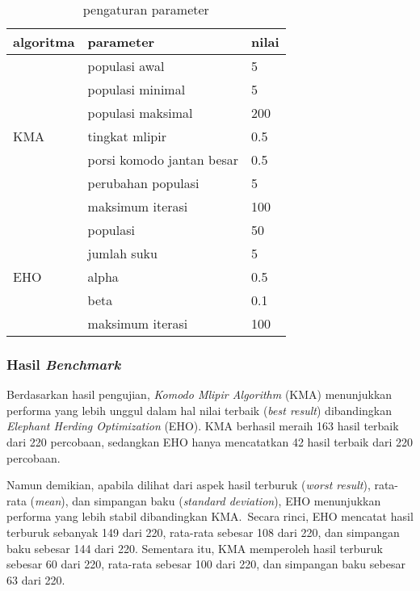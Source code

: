 \begin{table}[h!]
\centering
\caption{pengaturan parameter}
\label{tab:pengaturan-parameter}
\begin{tabular}{|l|l|l|}
\hline
algoritma            & parameter                 & nilai \\ \hline
\multirow{7}{*}{KMA} & populasi awal             & 5     \\ \cline{2-3} 
                     & populasi minimal          & 5     \\ \cline{2-3} 
                     & populasi maksimal         & 200   \\ \cline{2-3} 
                     & tingkat mlipir            & 0.5   \\ \cline{2-3} 
                     & porsi komodo jantan besar & 0.5   \\ \cline{2-3} 
                     & perubahan populasi        & 5     \\ \cline{2-3} 
                     & maksimum iterasi          & 100   \\ \hline
\multirow{5}{*}{EHO} & populasi                  & 50    \\ \cline{2-3} 
                     & jumlah suku               & 5     \\ \cline{2-3} 
                     & alpha                     & 0.5   \\ \cline{2-3} 
                     & beta                      & 0.1   \\ \cline{2-3} 
                     & maksimum iterasi          & 100   \\ \hline
\end{tabular}
\end{table}

\subsubsection{Hasil \textit{Benchmark}}
Berdasarkan hasil pengujian, \textit{Komodo Mlipir Algorithm} (KMA) menunjukkan performa yang lebih unggul dalam hal nilai terbaik (\textit{best result}) dibandingkan \textit{Elephant Herding Optimization} (EHO). KMA berhasil meraih 163 hasil terbaik dari 220 percobaan, sedangkan EHO hanya mencatatkan 42 hasil terbaik dari 220 percobaan.

Namun demikian, apabila dilihat dari aspek hasil terburuk (\textit{worst result}), rata-rata (\textit{mean}), dan simpangan baku (\textit{standard deviation}), EHO menunjukkan performa yang lebih stabil dibandingkan KMA.\ Secara rinci, EHO mencatat hasil terburuk sebanyak 149 dari 220, rata-rata sebesar 108 dari 220, dan simpangan baku sebesar 144 dari 220. Sementara itu, KMA memperoleh hasil terburuk sebesar 60 dari 220, rata-rata sebesar 100 dari 220, dan simpangan baku sebesar 63 dari 220.

